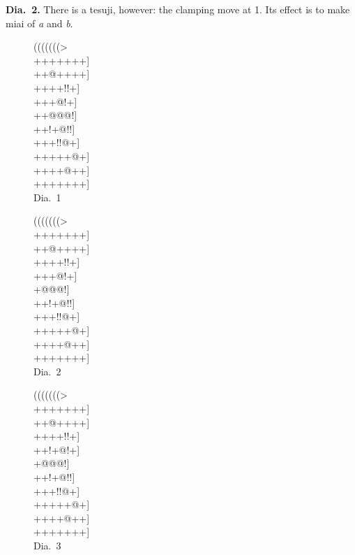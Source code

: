 \documentclass[royalvopaper,10pt,twoside,onecolumn,draft]{memoir}
\begin{document}
\noindent
\textbf{Dia.\ 2.} There is a tesuji, however: the clamping move at 1. Its effect is
to make miai of \textit{a} and \textit{b}.
\begin{figure}
    \begin{minipage}[c]{0.33\linewidth}
        \centering    
        {\gnos%
        (((((((>\\
        +++++++]\\
        ++@++++]\\
        ++++!!+]\\
        +++@!+]\\
        ++@@@!]\\
        ++!+@!!]\\
        +++!!@+]\\
        +++++@+]\\
        ++++@++]\\
        +++++++]\\
        }
        Dia.\ 1
    \end{minipage}%
    \begin{minipage}[c]{0.34\linewidth}
        \centering    
        {\gnos%
        (((((((>\\
        +++++++]\\
        ++@++++]\\
        ++++!!+]\\
        ++{\gnosw{}}+@!+]\\
        +@@@!]\\
        ++!+@!!]\\
        +++!!@+]\\
        +++++@+]\\
        ++++@++]\\
        +++++++]\\
        }
        Dia.\ 2
    \end{minipage}%
    \begin{minipage}[c]{0.33\linewidth}
        \centering    
        {\gnos%
        (((((((>\\
        +++++++]\\
        ++@++++]\\
        ++++!!+]\\
        ++!+@!+]\\
        +{\gnosw{}}@{\gnosb{}}@@!]\\
        ++!+@!!]\\
        +++!!@+]\\
        +++++@+]\\
        ++++@++]\\
        +++++++]\\
        }
        Dia.\ 3
    \end{minipage}%
\end{figure}
\end{document}
